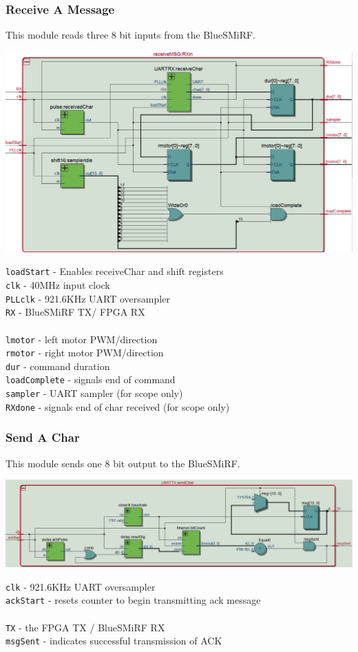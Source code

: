 \documentclass[12pt]{article}
\begin{document}
\subsubsection{Receive A Message}
This module reads three 8 bit inputs from the BlueSMiRF.
\begin{center}
\includegraphics[width=\textwidth]{rxin}
\end{center}
\verb.loadStart. - Enables receiveChar and shift registers
\\ \verb.clk. - 40MHz input clock
\\ \verb.PLLclk. - 921.6KHz UART oversampler
\\ \verb.RX. - BlueSMiRF TX/ FPGA RX
\\\\ \verb.lmotor. - left motor PWM/direction
\\ \verb.rmotor. - right motor PWM/direction
\\ \verb.dur. - command duration
\\ \verb.loadComplete. - signals end of command
\\ \verb.sampler. - UART sampler (for scope only)
\\ \verb.RXdone. - signals end of char received (for scope only)

\newpage
\subsubsection{Send A Char}
This module sends one 8 bit output to the BlueSMiRF.
\begin{center}
\includegraphics[width=\textwidth]{sendChar}
\end{center}
\verb.clk. - 921.6KHz UART oversampler
\\ \verb.ackStart. - resets counter to begin transmitting ack message
\\\\ \verb.TX. - the FPGA TX / BlueSMiRF RX
\\ \verb.msgSent. - indicates successful transmission of ACK
\end{document}
